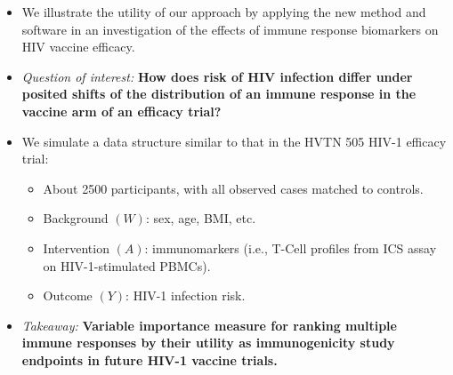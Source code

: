 \documentclass[landscape,a0paper,fontscale=0.285]{baposter} %
\newcommand{\compresslist}{ %
\setlength{\itemsep}{1pt}
\setlength{\parskip}{0pt}
\setlength{\parsep}{0pt}
}
\begin{document}
\begin{poster}
{\begin{itemize}\compresslist
\setlength\itemsep{0.5em}
\item We illustrate the utility of our approach by applying the new method and
  software in an investigation of the effects of immune response biomarkers on
  HIV vaccine efficacy.
\item \textit{Question of interest:} \textbf{How does risk of HIV infection
   differ under posited shifts of the distribution of an immune response in the
   vaccine arm of an efficacy trial?}
\item We simulate a data structure similar to that in the HVTN 505 HIV-1
  efficacy trial:
  \begin{itemize}
    \itemsep0.5pt
    \item About 2500 participants, with all observed cases matched to controls.
    \item Background $(W)$: sex, age, BMI, etc.
    \item Intervention $(A)$: immunomarkers (i.e., T-Cell profiles from ICS
      assay on HIV-1-stimulated PBMCs).
    \item Outcome $(Y)$: HIV-1 infection risk.
  \end{itemize}
\item \textit{Takeaway:} \textbf{Variable importance measure for ranking
   multiple immune responses by their utility as immunogenicity study endpoints
   in future HIV-1 vaccine trials.}
\end{itemize}
}




\end{poster}
\end{document}
